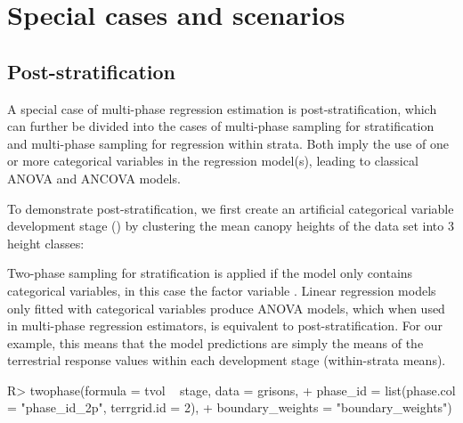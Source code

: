 \newpage



\section{Special cases and scenarios}
\label{sec:speccas_and_scen}

\subsection{Post-stratification}

A special case of multi-phase regression estimation is post-stratification, which can further be divided into the cases of multi-phase sampling for stratification and multi-phase sampling for regression within strata. Both imply the use of one or more categorical variables in the regression model(s), leading to classical ANOVA and ANCOVA models.

To demonstrate post-stratification, we first create an artificial categorical variable development stage () by clustering the mean canopy heights of the  data set into 3 height classes:

\begin{small}
\begin{Schunk}
\end{Schunk}
\end{small}

Two-phase sampling for stratification is applied if the model only contains categorical variables, in this case the factor variable . Linear regression models only fitted with categorical variables produce ANOVA models, which when used in multi-phase regression estimators, is equivalent to post-stratification. For our example, this means that the model predictions are simply the means of the terrestrial response values within each development stage (within-strata means).

\begin{small}
\begin{Schunk}
\begin{Sinput}
R> twophase(formula = tvol ~ stage, data = grisons, 
+    phase_id = list(phase.col = "phase_id_2p", terrgrid.id = 2),
+    boundary_weights = "boundary_weights")
\end{Sinput}
\end{Schunk}
\end{small}

